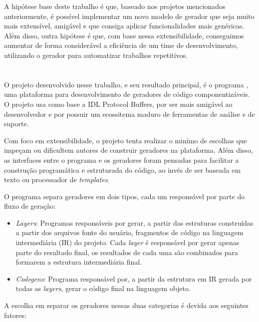 A hipótese base deste trabalho é que, baseado nos projetos mencionados anteriormente,
é possível implementar um novo modelo de gerador que seja muito mais extensível, amigável
e que consiga aplicar funcionalidades mais genéricas. Além disso, outra hipótese
é que, com base nessa extensibilidade, conseguimos aumentar de forma considerável a
eficiência de um time de desenvolvimento, utilizando o gerador para automatizar
trabalhos repetitivos.

\section{\Baker{}}

O projeto desenvolvido nesse trabalho, e seu resultado principal, é o programa \Baker{}
\cite{baker}, uma plataforma para desenvolvimento de geradores de código componentizáveis.
O projeto usa como base a IDL Protocol Buffers, por ser mais amigável ao desenvolvedor e
por possuir um ecossitema maduro de ferramentas de análise e de suporte.

Com foco em extensibilidade, o projeto tenta realizar o minímo de escolhas que impeçam ou
dificultem autores de construir geradores na plataforma. Além disso, as interfaces entre o
programa e os geradores foram pensadas para facilitar a construção programática e estruturada
do código, ao invés de ser baseada em texto ou processador de \textit{templates}.

O programa separa geradores em dois tipos, cada um responsável por parte do fluxo de geração:

\begin{itemize}
\item \textit{Layers}: Programas responsáveis por gerar, a partir das estruturas construídas
  a partir dos arquivos fonte do usuário, fragmentos de código na linguagem intermediária (IR)
  do projeto. Cada \textit{layer} é responsável por gerar apenas parte do resultado final, os
  resultados de cada uma são combinados para formarem a estrutura intermediária final.
\item \textit{Codegens}: Programa responsável por, a partir da estrutura em IR gerada por todas
  as \textit{layers}, gerar o código final na linguagem objeto.
\end{itemize}

A escolha em separar os geradores nessas duas categorias é devida aos seguintes fatores:

